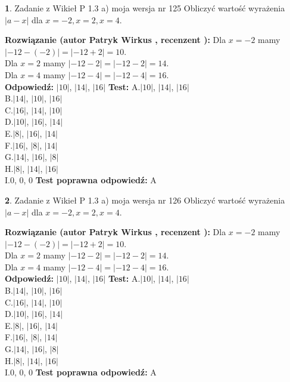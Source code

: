 \documentclass[12pt, a4paper]{article}
\theoremstyle{definition} %
\newtheorem{zad}{}
\newcommand{\zadStart}[1]{\begin{zad}#1\newline}
\newcommand{\zadStop}{\end{zad}}
\newcommand{\rozwStart}[2]{\noindent \textbf{Rozwiązanie (autor #1 , recenzent #2): }\newline}
\newcommand{\rozwStop}{\newline}
\newcommand{\odpStart}{\noindent \textbf{Odpowiedź:}\newline}
\newcommand{\odpStop}{\newline}
\newcommand{\testStart}{\noindent \textbf{Test:}\newline}
\newcommand{\testStop}{\newline}
\newcommand{\kluczStart}{\noindent \textbf{Test poprawna odpowiedź:}\newline}
\newcommand{\kluczStop}{\newline}
\begin{document}
\zadStart{Zadanie z Wikieł P 1.3 a) moja wersja nr 125}
Obliczyć wartość wyrażenia $|a - x|$ dla $x=-2,x=2,x=4$.
\zadStop
\rozwStart{Patryk Wirkus}{}
Dla $x = -2$ mamy $|-12 - (-2)| = |-12 + 2| = 10$.\\
Dla $x = 2$ mamy $|-12 - 2| = |-12 - 2| = 14$.\\
Dla $x = 4$ mamy $|-12 - 4| = |-12 - 4| = 16$.\\
\rozwStop
\odpStart
$|10|$, $|14|$, $|16|$
\odpStop
\testStart
A.$|10|$, $|14|$, $|16|$\\
B.$|14|$, $|10|$, $|16|$\\
C.$|16|$, $|14|$, $|10|$\\
D.$|10|$, $|16|$, $|14|$\\
E.$|8|$, $|16|$, $|14|$\\
F.$|16|$, $|8|$, $|14|$\\
G.$|14|$, $|16|$, $|8|$\\
H.$|8|$, $|14|$, $|16|$\\
I.$0$, $0$, $0$
\testStop
\kluczStart
A
\kluczStop



\zadStart{Zadanie z Wikieł P 1.3 a) moja wersja nr 126}
Obliczyć wartość wyrażenia $|a - x|$ dla $x=-2,x=2,x=4$.
\zadStop
\rozwStart{Patryk Wirkus}{}
Dla $x = -2$ mamy $|-12 - (-2)| = |-12 + 2| = 10$.\\
Dla $x = 2$ mamy $|-12 - 2| = |-12 - 2| = 14$.\\
Dla $x = 4$ mamy $|-12 - 4| = |-12 - 4| = 16$.\\
\rozwStop
\odpStart
$|10|$, $|14|$, $|16|$
\odpStop
\testStart
A.$|10|$, $|14|$, $|16|$\\
B.$|14|$, $|10|$, $|16|$\\
C.$|16|$, $|14|$, $|10|$\\
D.$|10|$, $|16|$, $|14|$\\
E.$|8|$, $|16|$, $|14|$\\
F.$|16|$, $|8|$, $|14|$\\
G.$|14|$, $|16|$, $|8|$\\
H.$|8|$, $|14|$, $|16|$\\
I.$0$, $0$, $0$
\testStop
\kluczStart
A
\kluczStop
\end{document}
